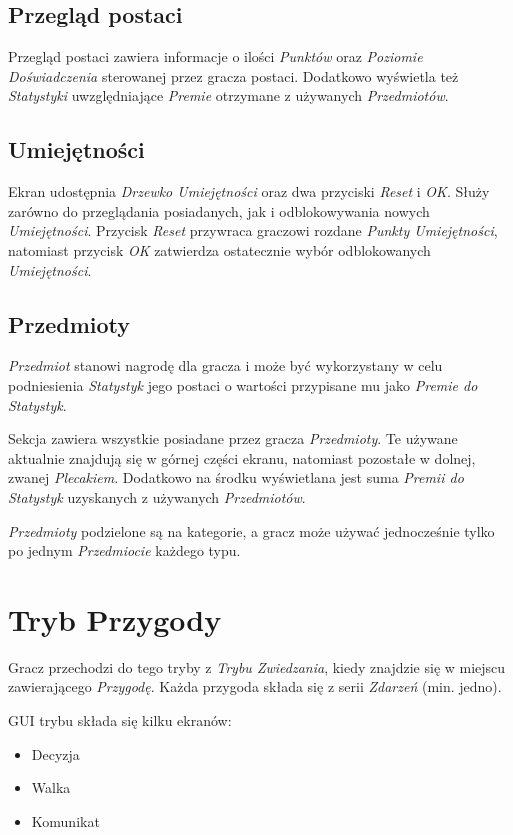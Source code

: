 \documentclass[openright]{xmgr}
\begin{document}
\subsection*{Przegląd postaci}
Przegląd postaci zawiera informacje o ilości \textit{Punktów} oraz \textit{Poziomie Doświadczenia} sterowanej przez gracza postaci. Dodatkowo wyświetla też \textit{Statystyki} uwzględniające \textit{Premie} otrzymane z używanych \textit{Przedmiotów}.
\subsection*{Umiejętności}
Ekran udostępnia \textit{Drzewko Umiejętności} oraz dwa przyciski \textit{Reset} i \textit{OK}. Służy zarówno do przeglądania posiadanych, jak i odblokowywania nowych \textit{Umiejętności}. Przycisk \textit{Reset} przywraca graczowi rozdane \textit{Punkty Umiejętności}, natomiast przycisk \textit{OK} zatwierdza ostatecznie wybór odblokowanych \textit{Umiejętności}.
\subsection*{Przedmioty}
\textit{Przedmiot} stanowi nagrodę dla gracza i może być wykorzystany w celu podniesienia \textit{Statystyk} jego postaci o wartości przypisane mu jako \textit{Premie do Statystyk}.

Sekcja zawiera wszystkie posiadane przez gracza \textit{Przedmioty}. Te używane aktualnie znajdują się w górnej części ekranu, natomiast pozostałe w dolnej, zwanej \textit{Plecakiem}. Dodatkowo na środku wyświetlana jest suma \textit{Premii do Statystyk} uzyskanych z używanych \textit{Przedmiotów}.

\textit{Przedmioty} podzielone są na kategorie, a gracz może używać jednocześnie tylko po jednym \textit{Przedmiocie} każdego typu.
\section{Tryb Przygody}

Gracz przechodzi do tego tryby z \textit{Trybu Zwiedzania}, kiedy znajdzie się w miejscu zawierającego \textit{Przygodę}. Każda przygoda składa się z serii \textit{Zdarzeń} (min. jedno).

GUI trybu składa się kilku ekranów:
\begin{itemize}
	\item Decyzja
	\item Walka
	\item Komunikat
\end{itemize}
\end{document}
